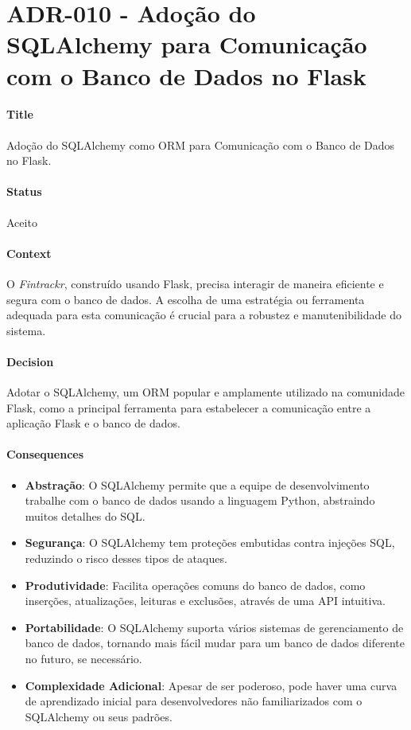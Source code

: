 \chapter{ADR-010 - Adoção do SQLAlchemy para Comunicação com o Banco de Dados no Flask}
\label{apendiceADR010}

\subsubsection*{Title}
Adoção do SQLAlchemy como ORM para Comunicação com o Banco de Dados no Flask.

\subsubsection*{Status}
Aceito

\subsubsection*{Context}
O \textit{Fintrackr}, construído usando Flask, precisa interagir de maneira eficiente e segura com o banco de dados. A escolha de uma estratégia ou ferramenta adequada para esta comunicação é crucial para a robustez e manutenibilidade do sistema.

\subsubsection*{Decision}
Adotar o SQLAlchemy, um ORM popular e amplamente utilizado na comunidade Flask, como a principal ferramenta para estabelecer a comunicação entre a aplicação Flask e o banco de dados.

\subsubsection*{Consequences}
\begin{itemize}
	\item \textbf{Abstração}: O SQLAlchemy permite que a equipe de desenvolvimento trabalhe com o banco de dados usando a linguagem Python, abstraindo muitos detalhes do SQL.
	\item \textbf{Segurança}: O SQLAlchemy tem proteções embutidas contra injeções SQL, reduzindo o risco desses tipos de ataques.
	\item \textbf{Produtividade}: Facilita operações comuns do banco de dados, como inserções, atualizações, leituras e exclusões, através de uma API intuitiva.
	\item \textbf{Portabilidade}: O SQLAlchemy suporta vários sistemas de gerenciamento de banco de dados, tornando mais fácil mudar para um banco de dados diferente no futuro, se necessário.
	\item \textbf{Complexidade Adicional}: Apesar de ser poderoso, pode haver uma curva de aprendizado inicial para desenvolvedores não familiarizados com o SQLAlchemy ou seus padrões.
\end{itemize}

